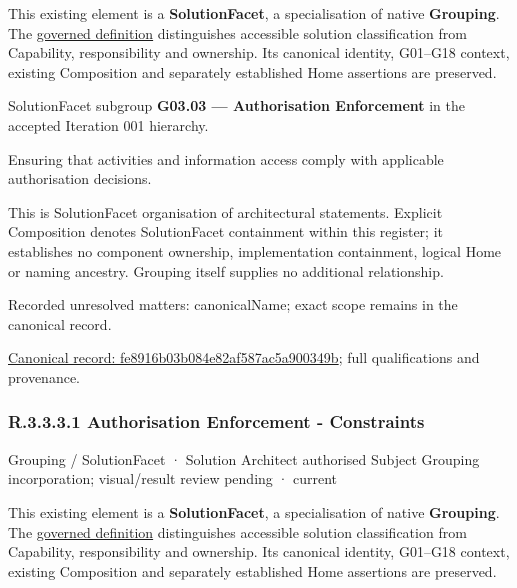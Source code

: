 This existing element is a \textbf{SolutionFacet}, a specialisation of native
\textbf{Grouping}. The \href{\detokenize{../../../../../../../governance/continuum-representation.md#solutionfacet-classification--1119-candidate}}{governed definition}
distinguishes accessible solution classification from Capability, responsibility
and ownership. Its canonical identity, G01–G18 context, existing Composition
and separately established Home assertions are preserved.



SolutionFacet subgroup \textbf{G03.03 — Authorisation Enforcement} in the accepted Iteration 001 hierarchy.



Ensuring that activities and information access comply with applicable authorisation decisions.



This is SolutionFacet organisation of architectural statements. Explicit Composition denotes SolutionFacet containment within this register; it establishes no component ownership, implementation containment, logical Home or naming ancestry. Grouping itself supplies no additional relationship.


{\small Recorded unresolved matters: canonicalName; exact scope remains in the canonical record.}\par
{\footnotesize \href{../../../../../../../continuum/grouping/fe8916b03b084e82af587ac5a900349b.md}{Canonical record: fe8916b03b084e82af587ac5a900349b}; full qualifications and provenance.}\par
\subsubsection*{R.3.3.3.1 Authorisation Enforcement - Constraints}
\label{navigation:R.3.3.3.1}

\label{element:202ebe880cc8456bb5e9f1389cc26fe8}
{\small Grouping / SolutionFacet · Solution Architect authorised Subject Grouping incorporation; visual/result review pending · current}\par

This existing element is a \textbf{SolutionFacet}, a specialisation of native
\textbf{Grouping}. The \href{\detokenize{../../../../../../../governance/continuum-representation.md#solutionfacet-classification--1119-candidate}}{governed definition}
distinguishes accessible solution classification from Capability, responsibility
and ownership. Its canonical identity, G01–G18 context, existing Composition
and separately established Home assertions are preserved.




